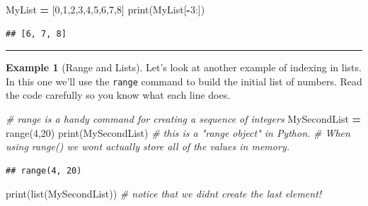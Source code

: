 \documentclass[
]{book}
\newenvironment{Shaded}{\begin{snugshade}}{\end{snugshade}}
\newcommand{\BuiltInTok}[1]{#1}
\newcommand{\CommentTok}[1]{\textcolor[rgb]{0.56,0.35,0.01}{\textit{#1}}}
\newcommand{\DecValTok}[1]{\textcolor[rgb]{0.00,0.00,0.81}{#1}}
\newcommand{\NormalTok}[1]{#1}
\newcommand{\OperatorTok}[1]{\textcolor[rgb]{0.81,0.36,0.00}{\textbf{#1}}}
\theoremstyle{definition}
\theoremstyle{definition}
\newtheorem{example}{Example}[chapter]
\theoremstyle{definition}
\theoremstyle{remark}
\begin{document}
\begin{Shaded}
\begin{Highlighting}[]
\NormalTok{MyList }\OperatorTok{=}\NormalTok{ [}\DecValTok{0}\NormalTok{,}\DecValTok{1}\NormalTok{,}\DecValTok{2}\NormalTok{,}\DecValTok{3}\NormalTok{,}\DecValTok{4}\NormalTok{,}\DecValTok{5}\NormalTok{,}\DecValTok{6}\NormalTok{,}\DecValTok{7}\NormalTok{,}\DecValTok{8}\NormalTok{] }
\BuiltInTok{print}\NormalTok{(MyList[}\OperatorTok{{-}}\DecValTok{3}\NormalTok{:])}
\end{Highlighting}
\end{Shaded}

\begin{verbatim}
## [6, 7, 8]
\end{verbatim}

\begin{center}\rule{0.5\linewidth}{0.5pt}\end{center}

\begin{example}[Range and Lists]
\protect\hypertarget{exm:unnamed-chunk-640}{}{\label{exm:unnamed-chunk-640} {} }Let's look at another example of indexing in lists. In this one we'll use the \texttt{range} command to build the initial list of numbers. Read the code carefully so you know what each line does.
\end{example}

\begin{Shaded}
\begin{Highlighting}[]
\CommentTok{\# range is a handy command for creating a sequence of integers}
\NormalTok{MySecondList }\OperatorTok{=} \BuiltInTok{range}\NormalTok{(}\DecValTok{4}\NormalTok{,}\DecValTok{20}\NormalTok{) }
\BuiltInTok{print}\NormalTok{(MySecondList) }\CommentTok{\# this is a "range object" in Python.  }
\CommentTok{\# When using range() we won\textquotesingle{}t actually store all of the values in memory.}
\end{Highlighting}
\end{Shaded}

\begin{verbatim}
## range(4, 20)
\end{verbatim}

\begin{Shaded}
\begin{Highlighting}[]
\BuiltInTok{print}\NormalTok{(}\BuiltInTok{list}\NormalTok{(MySecondList)) }\CommentTok{\# notice that we didn\textquotesingle{}t create the last element!}
\end{Highlighting}
\end{Shaded}
\end{document}
